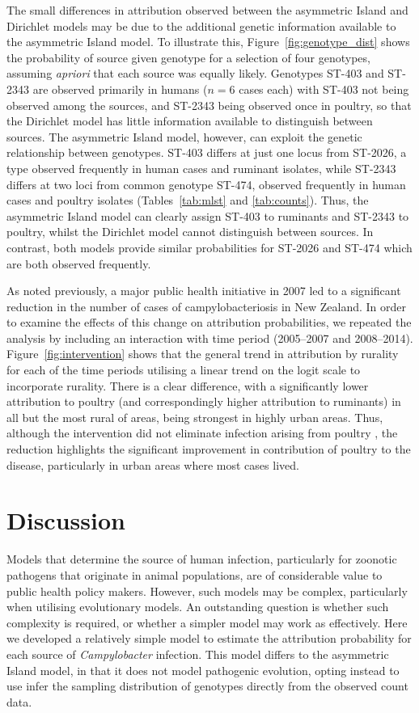 \documentclass[AMA,STIX1COL]{WileyNJD-v2}
\begin{document}
The small differences in attribution observed between the asymmetric Island and Dirichlet models may be due to the additional genetic information available to the asymmetric Island model. To illustrate this, Figure~\ref{fig:genotype_dist} shows the probability of source given genotype for a selection of four genotypes, assuming \emph{apriori} that each source was equally likely. Genotypes ST-403 and ST-2343 are observed primarily in humans ($n=6$ cases each) with ST-403 not being observed among the sources, and ST-2343 being observed once in poultry, so that the Dirichlet model has little information available to distinguish between sources. The asymmetric Island model, however, can exploit the genetic relationship between genotypes. ST-403 differs at just one locus from ST-2026, a type observed frequently in human cases and ruminant isolates, while ST-2343 differs at two loci from common genotype ST-474, observed frequently in human cases and poultry isolates (Tables~\ref{tab:mlst} and \ref{tab:counts}). Thus, the asymmetric Island model can clearly assign ST-403 to ruminants and ST-2343 to poultry, whilst the Dirichlet model cannot distinguish between sources. In contrast, both models provide similar probabilities for ST-2026 and ST-474 which are both observed frequently.

As noted previously, a major public health initiative in 2007 led to a significant reduction in the number of cases of campylobacteriosis in New Zealand. In order to examine the effects of this change on attribution probabilities, we repeated the analysis by including an interaction with time period (2005--2007 and 2008--2014). Figure~\ref{fig:intervention} shows that the general trend in attribution by rurality for each of the time periods utilising a linear trend on the logit scale to incorporate rurality. There is a clear difference, with a significantly lower attribution to poultry (and correspondingly higher attribution to ruminants) in all but the most rural of areas, being strongest in highly urban areas. Thus, although the intervention did not eliminate infection arising from poultry \cite{MuelM}, the reduction highlights the significant improvement in contribution of poultry to the disease, particularly in urban areas where most cases lived.

\section{Discussion}
Models that determine the source of human infection, particularly for zoonotic pathogens that originate in animal populations, are of considerable value to public health policy makers. However, such models may be complex, particularly when utilising evolutionary models. An outstanding question is whether such complexity is required, or whether a simpler model may work as effectively. Here we developed a relatively simple model to estimate the attribution probability for each source of \textit{Campylobacter} infection. This model differs to the asymmetric Island model, in that it does not model pathogenic evolution, opting instead to use infer the sampling distribution of genotypes directly from the observed count data.
\end{document}
